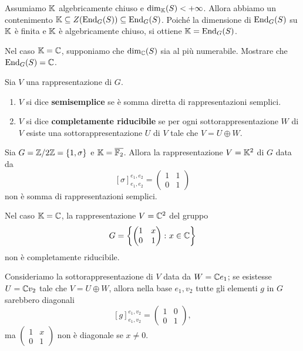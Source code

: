 \begin{example}
Assumiamo $\mathbb{K}$ algebricamente chiuso e $\dim_{\mathbb{K}}(S)<+\infty$. Allora abbiamo un contenimento $\mathbb{K}\subseteq Z(\operatorname{End}_G(S))\subseteq \operatorname{End}_G(S)$. Poiché la dimensione di $\operatorname{End}_G(S)$ su $\mathbb{K}$ è finita e $\mathbb{K}$ è algebricamente chiuso, si ottiene $\mathbb{K}=\operatorname{End}_G(S)$.
\end{example}

\begin{exercise}
    Nel caso $\mathbb{K}=\mathbb{C}$, supponiamo che $\dim_{\mathbb{C}}(S)$ sia al più numerabile. Mostrare che $\operatorname{End}_G(S)=\mathbb{C}$.
\end{exercise}

\begin{definition}
    Sia $V$ una rappresentazione di $G$. \begin{enumerate}
        \item $V$ si dice \textbf{semisemplice} se è somma diretta di rappresentazioni semplici.
        \item $V$ si dice \textbf{completamente riducibile} se per ogni sottorappresentazione $W$ di $V$ esiste una sottorappresentazione $U$ di $V$ tale che $V=U\oplus W$.
    \end{enumerate}
\end{definition}

\begin{example}
    Sia $G={\mathbb{Z}/{2}\mathbb{Z}}=\{1,\sigma\}$ e $\mathbb{K}=\overline{\mathbb{F}_2}$. Allora la rappresentazione $V=\mathbb{K}^2$ di $G$ data da  \[[\sigma]_{e_1,e_2}^{e_1,e_2}=\begin{pmatrix}
        1 & 1 \\ 
        0 & 1
    \end{pmatrix}\] non è somma di rappresentazioni semplici. 
\end{example}


\begin{example}
    Nel caso $\mathbb{K}=\mathbb{C}$, la rappresentazione $V=\mathbb{C}^2$ del gruppo \[G=\left\{\begin{pmatrix}
        1 & x \\ 
        0 & 1
    \end{pmatrix} \colon x\in \mathbb{C}\right\}\] non è completamente riducibile.
\end{example}
\begin{solution}
Consideriamo la sottorappresentazione di $V$ data da $W=\mathbb{C} e_1$; se esistesse $U=\mathbb{C} v_2$ tale che $V=U\oplus W$, allora nella base $e_1,v_2$ tutte gli elementi $g$ in $G$ sarebbero diagonali \[[g]_{e_1,v_2}^{e_1,v_2}=
\begin{pmatrix}
        1 & 0 \\ 
        0 & 1
\end{pmatrix},\]
ma $\begin{pmatrix}
        1 & x \\ 
        0 & 1
\end{pmatrix}$ non è diagonale se $x\ne 0$.
\end{solution}


